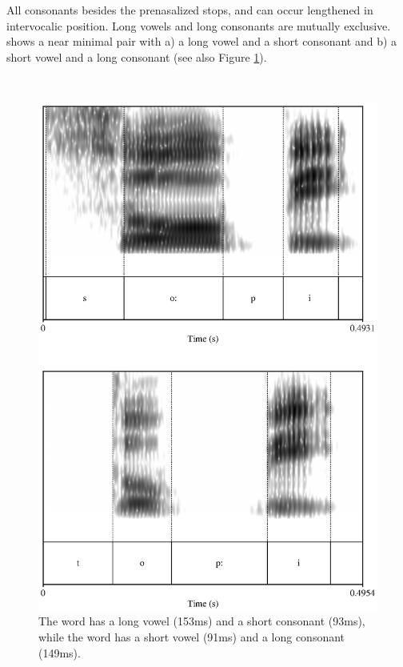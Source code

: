 All consonants besides the prenasalized stops, \dentd{} and \V{} can occur lengthened in intervocalic position. Long vowels and long consonants are mutually exclusive.  shows a near minimal pair with a) a long vowel and a short consonant and b) a short vowel and a long consonant (see also Figure \ref{fig:soopithoppi}).

 \\
\begin{figure}
 \centering
 \includegraphics{pics/soopithoppi.eps}
 \caption[Vowel and consonant length in  and ]{The word  has a long vowel (153ms) and a short consonant (93ms), while the word  has a short vowel (91ms) and a long consonant (149ms).}
 \label{fig:soopithoppi}
\end{figure}





